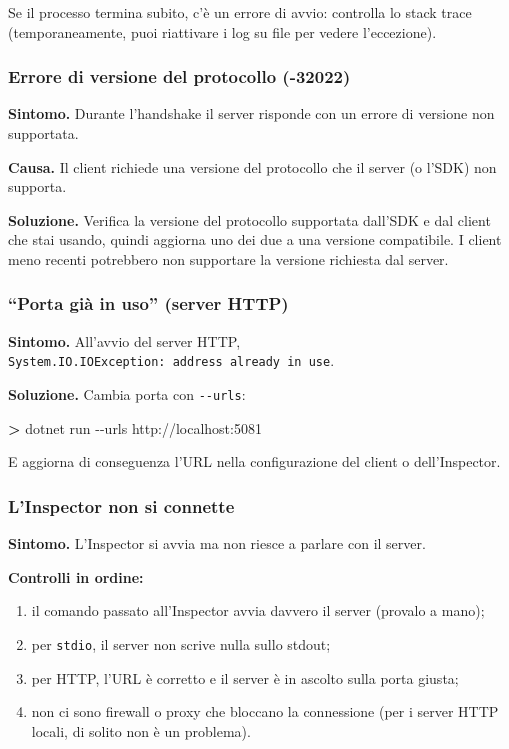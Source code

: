\documentclass[
  italian,
  10pt,
]{book}
\newenvironment{Shaded}{\begin{snugshade}}{\end{snugshade}}
\newcommand{\AttributeTok}[1]{\textcolor[rgb]{0.13,0.29,0.53}{#1}}
\newcommand{\ExtensionTok}[1]{#1}
\newcommand{\NormalTok}[1]{#1}
\newcommand{\OperatorTok}[1]{\textcolor[rgb]{0.81,0.36,0.00}{\textbf{#1}}}
\providecommand{\tightlist}{%
  \setlength{\itemsep}{0pt}\setlength{\parskip}{0pt}}
\begin{document}
Se il processo termina subito, c'è un errore di avvio: controlla lo
stack trace (temporaneamente, puoi riattivare i log su file per vedere
l'eccezione).

\subsubsection{Errore di versione del protocollo
(-32022)}\label{errore-di-versione-del-protocollo--32022}

\textbf{Sintomo.} Durante l'handshake il server risponde con un errore
di versione non supportata.

\textbf{Causa.} Il client richiede una versione del protocollo che il
server (o l'SDK) non supporta.

\textbf{Soluzione.} Verifica la versione del protocollo supportata
dall'SDK e dal client che stai usando, quindi aggiorna uno dei due a una
versione compatibile. I client meno recenti potrebbero non supportare la
versione richiesta dal server.

\subsubsection{``Porta già in uso'' (server
HTTP)}\label{porta-giuxe0-in-uso-server-http}

\textbf{Sintomo.} All'avvio del server HTTP,
\texttt{System.IO.IOException:\ address\ already\ in\ use}.

\textbf{Soluzione.} Cambia porta con \texttt{-\/-urls}:

\begin{Shaded}
\begin{Highlighting}[]
\OperatorTok{\textgreater{}}\NormalTok{ dotnet }\ExtensionTok{run} \AttributeTok{{-}{-}urls}\NormalTok{ http://localhost:5081}
\end{Highlighting}
\end{Shaded}

E aggiorna di conseguenza l'URL nella configurazione del client o
dell'Inspector.

\subsubsection{L'Inspector non si
connette}\label{linspector-non-si-connette}

\textbf{Sintomo.} L'Inspector si avvia ma non riesce a parlare con il
server.

\textbf{Controlli in ordine:}

\begin{enumerate}
\def\labelenumi{\arabic{enumi}.}
\tightlist
\item
  il comando passato all'Inspector avvia davvero il server (provalo a
  mano);
\item
  per \texttt{stdio}, il server non scrive nulla sullo stdout;
\item
  per HTTP, l'URL è corretto e il server è in ascolto sulla porta
  giusta;
\item
  non ci sono firewall o proxy che bloccano la connessione (per i server
  HTTP locali, di solito non è un problema).
\end{enumerate}
\end{document}
